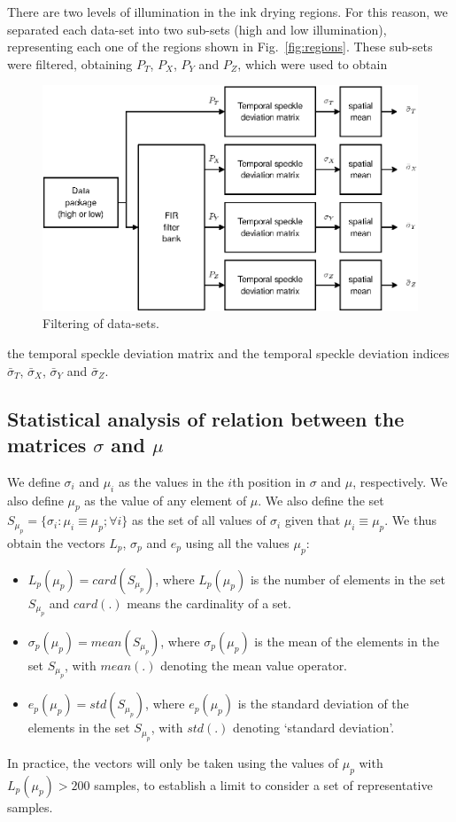 \documentclass[review]{elsarticle}
\begin{document}
There are two levels of illumination in the ink drying regions.
For this reason, we  separated each data-set into two sub-sets
(high and low illumination), representing each one of the regions shown in Fig.~\ref{fig:regions}.
These sub-sets were filtered,
obtaining $P_T$, $P_X$, $P_Y$ and $P_Z$, which were used to obtain
\begin{figure}[h!]
\centering
\includegraphics[width=0.65\columnwidth]{filtering.eps}
\caption{Filtering of data-sets.}
\label{fig:filtering}
\end{figure}
the temporal speckle deviation matrix and the 
temporal speckle deviation indices $\bar{\sigma}_T$, $\bar{\sigma}_X$, $\bar{\sigma}_Y$ and
$\bar{\sigma}_Z$.

\subsection{Statistical analysis of relation between the matrices $\sigma$ and $\mu$}
\label{subsec:statistical}
We define $\sigma_i$ and $\mu_i$
as the values in the $i$th position in $\sigma$  
and $\mu$, respectively. We also define $\mu_p$
as the value of any element of $\mu$.
We also define the set $S_{\mu_p}=\{\sigma_i: \mu_i\equiv \mu_p; \forall i\}$
as the set of all values of $\sigma_i$  given that $\mu_i\equiv\mu_p$.
We thus obtain the vectors $L_p$, $\sigma_p$ and
$e_p$ using all the values $\mu_p$:
\begin{itemize}
 \item $L_p(\mu_p)=card\left(S_{\mu_p}\right)$,  where $L_p(\mu_p)$ is the number of elements
 in the set $S_{\mu_p}$ and $card(.)$ means the cardinality of a set.
 \item $\sigma_p(\mu_p)=mean\left(S_{\mu_p}\right)$, where $\sigma_p(\mu_p)$
 is the mean of the elements in the set $S_{\mu_p}$, with $mean(.)$ denoting the mean value operator.
 \item $e_p(\mu_p)=std\left(S_{\mu_p}\right)$, where $e_p(\mu_p)$
 is the standard  deviation of the elements in the set $S_{\mu_p}$, with $std(.)$ denoting `standard deviation'.
\end{itemize}
In practice, the vectors will only be taken using the values of $\mu_p$
with $L_p(\mu_p)>200$ samples, to establish a limit to consider a set of representative samples.
\end{document}
